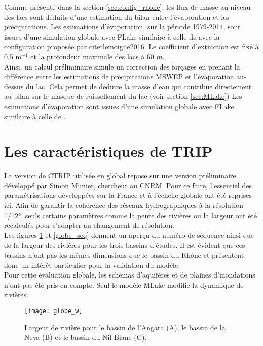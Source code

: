 Comme présenté dans la section \ref{sec:config_rhone}, les flux de masse au niveau des lacs sont déduits d'une estimation du bilan entre l'évaporation et les précipitations. Les estimations d'évaporation, sur la période  1979-2014, sont issues d'une simulation globale avec FLake similaire à celle de \citet{voldoire2019} avec la configuration proposée par citet{lemoigne2016}. Le coefficient d'extinction est fixé à 0.5 m$^{-1}$ et la profondeur maximale des lacs à 60 $m$.\\ Ainsi, un calcul préliminaire simule un correction des forçages en prenant la différence entre les estimations de précipitations MSWEP et l'évaporation au-dessus du lac. Cela permet de déduire la masse d'eau qui contribue directement au bilan sur le masque de ruissellement du lac (voir section \ref{sec:MLake})
Les estimations d'évaporation sont issues d'une simulation globale avec FLake similaire à celle de \citet{voldoire2019}.\\

\section{{\selectfont Les caractéristiques de TRIP}}
\label{sec:trip_globe_carac}

La version de CTRIP utilisée en global repose sur une version préliminaire développé par Simon Munier, chercheur au CNRM. Pour ce faire, l'essentiel des paramétrisations développées sur la France et à l'échelle globale \citep{decharme2010,decharme2012, decharme2019} ont été reprises ici. Afin de garantir la cohérence des réseaux hydrographiques à la résolution 1/12°, seuls certains paramètres comme la pente des rivières ou la largeur ont été recalculés pour s'adapter au changement de résolution.\\
Les figures \ref{globe_w} et \ref{globe_seq} donnent un aperçu du numéro de séquence ainsi que de la largeur des rivières pour les trois bassins d'études. Il est évident que ces bassins n'ont pas les mêmes dimensions que le bassin du Rhône et présentent donc un intérêt particulier pour la validation du modèle.\\
Pour cette évaluation globale, les schémas d'aquifères et de plaines d'inondations n'ont pas été pris en compte. Seul le modèle MLake modifie la dynamique de rivières.

\begin{figure}[h!]
\centering
\texttt{[image: globe\_w]}
\caption{Largeur de rivière pour le bassin de l'Angara (A), le bassin de la Neva (B) et le bassin du Nil Blanc (C).}
\label{globe_w}
\end{figure}

